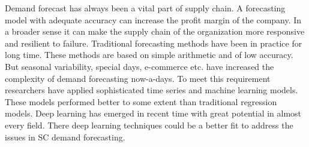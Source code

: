 Demand forecast has always been a vital part of supply chain. A forecasting model with adequate accuracy can increase the profit margin of the company. In a broader sense it can make the supply chain of the organization more responsive and resilient to failure. Traditional forecasting methods have been in practice for long time. These methods are based on simple arithmetic and of low accuracy. But seasonal variability, special days, e-commerce etc. have increased  the complexity of demand forecasting now-a-days. To meet this requirement researchers have applied sophisticated time series and machine learning models. These models performed better to some extent than traditional regression models. Deep learning has emerged in recent time with great potential in almost every field. There deep learning techniques could be a better fit to address the issues in SC demand forecasting. 
